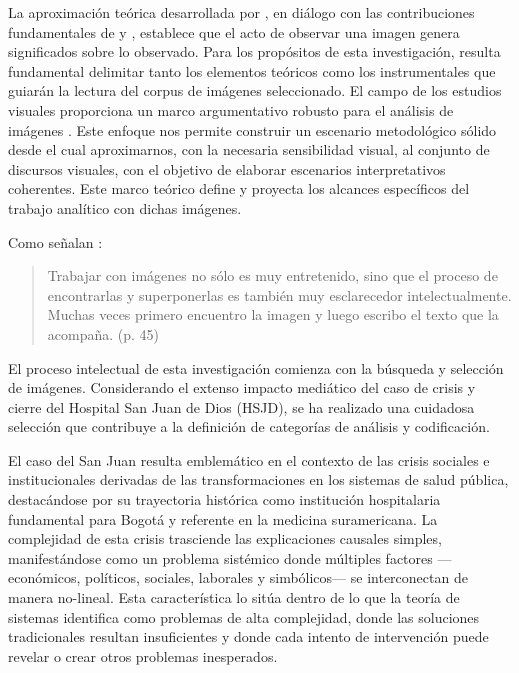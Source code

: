 La aproximación teórica desarrollada por \parencite{DidiHuberman2011}, en diálogo con las contribuciones fundamentales de \parencite{Benjamin2004} y \parencite{Warburg2010}, establece que el acto de observar una imagen genera significados sobre lo observado. Para los propósitos de esta investigación, resulta fundamental delimitar tanto los elementos teóricos como los instrumentales que guiarán la lectura del corpus de imágenes seleccionado. El campo de los estudios visuales proporciona un marco argumentativo robusto para el análisis de imágenes \parencite{Abril2007}. Este enfoque nos permite construir un escenario metodológico sólido desde el cual aproximarnos, con la necesaria sensibilidad visual, al conjunto de discursos visuales, con el objetivo de elaborar escenarios interpretativos coherentes. Este marco teórico define y proyecta los alcances específicos del trabajo analítico con dichas imágenes.


Como señalan \parencite{Perez2010}:
\begin{quote}
Trabajar con imágenes no sólo es muy entretenido, sino que el proceso de encontrarlas y superponerlas es también muy esclarecedor intelectualmente. Muchas veces primero encuentro la imagen y luego escribo el texto que la acompaña. (p. 45)
\end{quote}

El proceso intelectual de esta investigación comienza con la búsqueda y selección de imágenes. Considerando el extenso impacto mediático del caso de crisis y cierre del Hospital San Juan de Dios (HSJD), se ha realizado una cuidadosa selección que contribuye a la definición de categorías de análisis y codificación.

El caso del San Juan resulta emblemático en el contexto de las crisis sociales e institucionales derivadas de las transformaciones en los sistemas de salud pública, destacándose por su trayectoria histórica como institución hospitalaria fundamental para Bogotá y referente en la medicina suramericana. La complejidad de esta crisis trasciende las explicaciones causales simples, manifestándose como un problema sistémico donde múltiples factores —económicos, políticos, sociales, laborales y simbólicos— se interconectan de manera no-lineal. Esta característica lo sitúa dentro de lo que la teoría de sistemas identifica como problemas de alta complejidad, donde las soluciones tradicionales resultan insuficientes y donde cada intento de intervención puede revelar o crear otros problemas inesperados.

